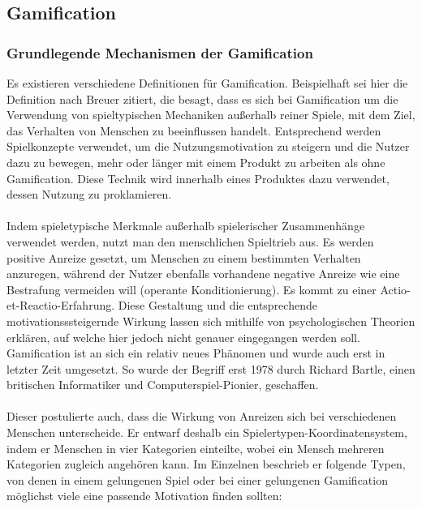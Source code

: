 \subsection{Gamification}
\subsubsection{Grundlegende Mechanismen der Gamification}
Es existieren verschiedene Definitionen für Gamification. Beispielhaft sei hier die Definition nach Breuer zitiert, die besagt, dass es sich bei Gamification um die \glqq Verwendung von spieltypischen Mechaniken außerhalb reiner Spiele, mit dem Ziel, das Verhalten von Menschen zu beeinflussen\grqq \cite{Src:GamifKochOtt} handelt. Entsprechend werden Spielkonzepte verwendet, um die Nutzungsmotivation zu steigern und die Nutzer dazu zu bewegen, mehr oder länger mit einem Produkt zu arbeiten als ohne Gamification. Diese Technik wird innerhalb eines Produktes dazu verwendet, dessen Nutzung zu proklamieren. \cite{Src:GamifKochOtt} \\ \\
Indem spieletypische Merkmale außerhalb spielerischer Zusammenhänge verwendet werden, nutzt man den menschlichen Spieltrieb aus. Es werden positive Anreize gesetzt, um Menschen zu einem bestimmten Verhalten anzuregen, während der Nutzer ebenfalls vorhandene negative Anreize wie eine Bestrafung vermeiden will (operante Konditionierung). \cite{Src:PlanetWissen} Es kommt zu einer \glqq Actio-et-Reactio\grqq -Erfahrung.\cite{Src:GamifKochOtt} Diese Gestaltung und die entsprechende motivationsssteigernde Wirkung lassen sich mithilfe von psychologischen Theorien erklären, auf welche hier jedoch nicht genauer eingegangen werden soll. Gamification ist an sich ein relativ neues Phänomen und wurde auch erst in letzter Zeit umgesetzt. So wurde der Begriff erst 1978 durch Richard Bartle, einen britischen Informatiker und Computerspiel-Pionier, geschaffen. \cite{Src:PlanetWissen} \\ \\
Dieser postulierte auch, dass die Wirkung von Anreizen sich bei verschiedenen Menschen unterscheide. Er entwarf deshalb ein Spielertypen-Koordinatensystem, indem er Menschen in vier Kategorien einteilte, wobei ein Mensch mehreren Kategorien zugleich angehören kann.\cite{Src:Bartle} Im Einzelnen beschrieb er folgende Typen, von denen in einem gelungenen Spiel oder bei einer gelungenen Gamification möglichst viele eine passende Motivation finden sollten:
